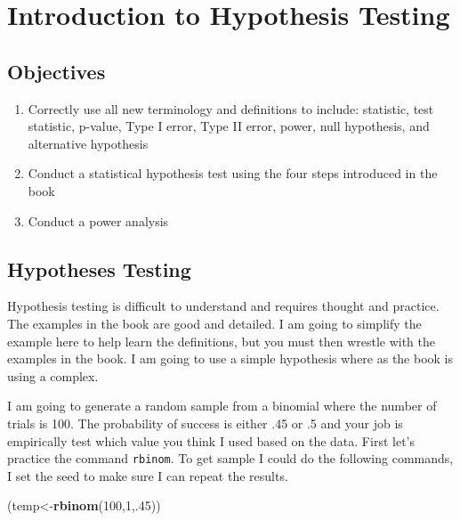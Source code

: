 \documentclass[]{book}
\newenvironment{Shaded}{\begin{snugshade}}{\end{snugshade}}
\newcommand{\KeywordTok}[1]{\textcolor[rgb]{0.13,0.29,0.53}{\textbf{#1}}}
\newcommand{\DecValTok}[1]{\textcolor[rgb]{0.00,0.00,0.81}{#1}}
\newcommand{\NormalTok}[1]{#1}
\providecommand{\tightlist}{%
  \setlength{\itemsep}{0pt}\setlength{\parskip}{0pt}}
\theoremstyle{definition}
\theoremstyle{definition}
\theoremstyle{definition}
\theoremstyle{remark}
\begin{document}
\hypertarget{L8}{\section{Introduction to Hypothesis Testing}\label{L8}}

\subsection{Objectives}\label{objectives-7}

\begin{enumerate}
\def\labelenumi{\arabic{enumi}.}
\tightlist
\item
  Correctly use all new terminology and definitions to include:
  statistic, test statistic, p-value, Type I error, Type II error,
  power, null hypothesis, and alternative hypothesis\\
\item
  Conduct a statistical hypothesis test using the four steps introduced
  in the book\\
\item
  Conduct a power analysis
\end{enumerate}

\subsection{Hypotheses Testing}\label{hypotheses-testing}

Hypothesis testing is difficult to understand and requires thought and
practice. The examples in the book are good and detailed. I am going to
simplify the example here to help learn the definitions, but you must
then wrestle with the examples in the book. I am going to use a simple
hypothesis where as the book is using a complex.

I am going to generate a random sample from a binomial where the number
of trials is 100. The probability of success is either .45 or .5 and
your job is empirically test which value you think I used based on the
data. First let's practice the command \texttt{rbinom}. To get sample I
could do the following commands, I set the seed to make sure I can
repeat the results.

\begin{Shaded}
\begin{Highlighting}[]
\NormalTok{(temp<-}\KeywordTok{rbinom}\NormalTok{(}\DecValTok{100}\NormalTok{,}\DecValTok{1}\NormalTok{,.}\DecValTok{45}\NormalTok{))}
\end{Highlighting}
\end{Shaded}
\end{document}

